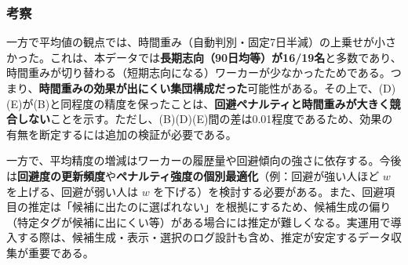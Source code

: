\subsubsection*{考察}
一方で平均値の観点では、時間重み（自動判別・固定7日半減）の上乗せが小さかった。これは、本データでは\textbf{長期志向（90日均等）が16/19名}と多数であり、時間重みが切り替わる（短期志向になる）ワーカーが少なかったためである。つまり、\textbf{時間重みの効果が出にくい集団構成だった}可能性がある。その上で、(D)(E)が(B)と同程度の精度を保ったことは、\textbf{回避ペナルティと時間重みが大きく競合しない}ことを示す。ただし、(B)(D)(E)間の差は0.01程度であるため、効果の有無を断定するには追加の検証が必要である。

一方で、平均精度の増減はワーカーの履歴量や回避傾向の強さに依存する。今後は\textbf{回避度の更新頻度}や\textbf{ペナルティ強度の個別最適化}（例：回避が強い人ほど $w$ を上げる、回避が弱い人は $w$ を下げる）を検討する必要がある。また、回避項目の推定は「候補に出たのに選ばれない」を根拠にするため、候補生成の偏り（特定タグが候補に出にくい等）がある場合には推定が難しくなる。実運用で導入する際は、候補生成・表示・選択のログ設計も含め、推定が安定するデータ収集が重要である。
